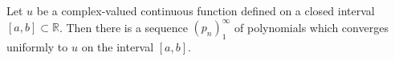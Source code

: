Let $u$ be a complex-valued continuous function defined on a closed interval $[a, b] \subset \mathbb{R}$. Then there is a sequence $(p_n)_{1}^{\infty}$ of polynomials which converges uniformly to $u$ on the interval $[a, b]$.
